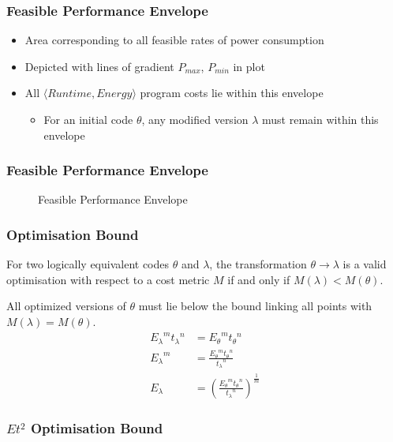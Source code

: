 \documentclass{beamer}
\begin{document}
  \begin{frame}
    \frametitle{Feasible Performance Envelope}
    \begin{itemize}
      \item Area corresponding to all feasible rates of power consumption
      \item Depicted with lines of gradient $P_{max}$, $P_{min}$ in plot
      \item All $\langle Runtime, Energy \rangle$ program costs lie within this envelope
      \begin{itemize}
        \item For an initial code $\theta$, any modified version $\lambda$ must remain within this envelope
      \end{itemize}
    \end{itemize}
  \end{frame}

  \begin{frame}
    \frametitle{Feasible Performance Envelope}
    \begin{figure}
    \centering
    
    \caption{Feasible Performance Envelope}
    \end{figure}
  \end{frame}

  \begin{frame}
    \frametitle{Optimisation Bound}
    \begin{definition}
    For two logically equivalent codes $\theta$ and $\lambda$, the transformation ${\theta \to \lambda}$ is a valid optimisation with respect to a cost metric $M$ if and only if ${M(\lambda) < M(\theta)}$. 
    \end{definition}
All optimized versions of $\theta$ must lie below the bound linking all points with ${M(\lambda) = M(\theta)}$.
\begin{align}
 {E_\lambda}^m{t_\lambda}^n &= {E_\theta}^m{t_\theta}^n \nonumber \\
 {E_\lambda}^m &= \frac{{E_\theta}^m{t_\theta}^n}{{t_\lambda}^n} \nonumber \\
  E_\lambda &= (\frac{{E_\theta}^m{t_\theta}^n}{{t_\lambda}^n})^\frac{1}{m}
\end{align}
  \end{frame}

  \begin{frame}
    \frametitle{$Et^2$ Optimisation Bound}
    \newcommand*{\OPTBOUND}{}%
    \begin{figure}
    \centering
    
    \end{figure}
  \end{frame}
\end{document}
